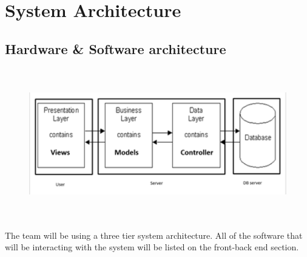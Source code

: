 \documentclass[a4paper,12pt]{report}
\begin{document}
\section*{System Architecture}
\par
\subsection*{Hardware & Software architecture}
 \par




\begin{figure}[H]
\begin{center}
\includegraphics[width=6.5in,height=2.57in]{./uploads_new/Lab_2.docx_DIR/media/image7.png}
\end{center}
\end{figure}




\vspace{12pt}
The team will be using a three tier system architecture. All of the software that will be interacting with the system will be listed on the front-back end section.  \par
\vspace{12pt}
\end{document}
